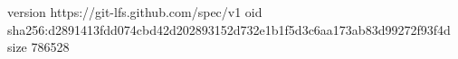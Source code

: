 version https://git-lfs.github.com/spec/v1
oid sha256:d2891413fdd074cbd42d202893152d732e1b1f5d3c6aa173ab83d99272f93f4d
size 786528
